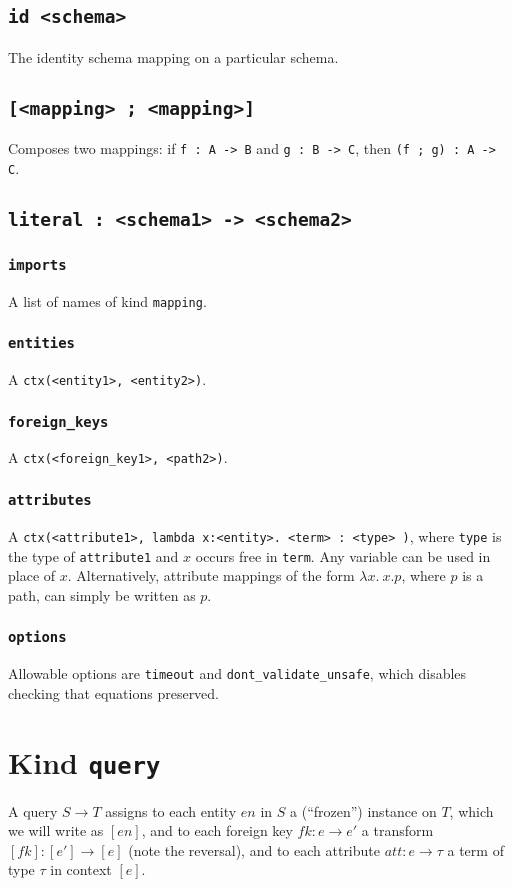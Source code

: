\documentclass[10pt]{book}
\begin{document}
\section{{\tt id <schema>}}
The identity schema mapping on a particular schema.

\section{{\tt [<mapping> ; <mapping>]}}
Composes two mappings: if {\tt f : A -> B} and {\tt g : B -> C}, then {\tt (f ; g) : A -> C}.

\section{{\tt literal : <schema1> -> <schema2>}}
\subsection{{\tt imports}}
A list of names of kind {\tt mapping}.
\subsection{{\tt entities}}
A {\tt ctx(<entity1>, <entity2>)}.
\subsection{{\tt foreign\_keys}}
A {\tt ctx(<foreign\_key1>, <path2>)}.  
\subsection{{\tt attributes}}
A {\tt ctx(<attribute1>, lambda x:<entity>. <term> : <type> )}, where {\tt type} is the type of {\tt attribute1} and $x$ occurs free in {\tt term}.  Any variable can be used in place of $x$.  Alternatively, attribute mappings of the form $\lambda x. \ x.p$, where $p$ is a path, can simply be written as $p$.

\subsection{{\tt options}}
Allowable options are {\tt timeout} and {\tt dont\_validate\_unsafe}, which disables checking that equations preserved.

\chapter{Kind  {\tt query}}
A query $S \to T$ assigns to each entity $en$ in $S$ a (``frozen'') instance on $T$, which we will write as $[en]$, and to each foreign key $fk : e \to e'$ a transform $[fk] : [e'] \to [e]$ (note the reversal), and to each attribute $att : e \to \tau$ a term of type $\tau$ in context $[e]$.  
\end{document}
